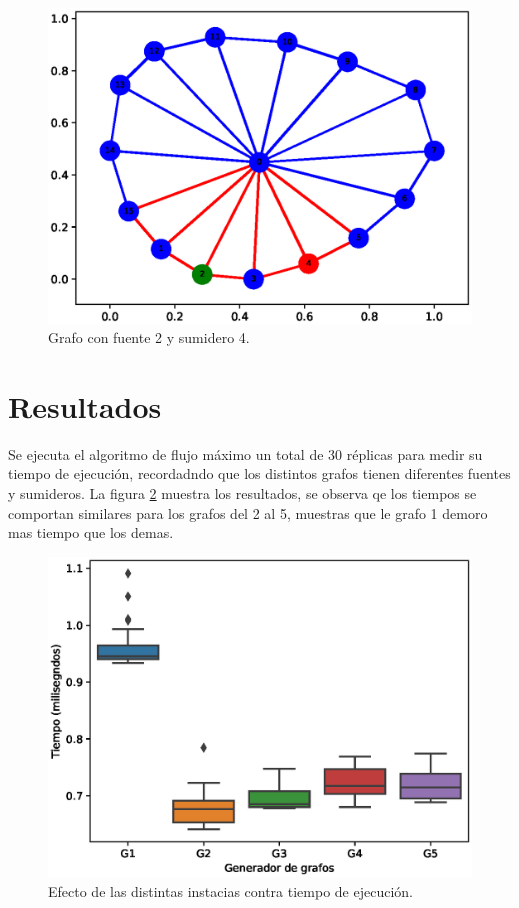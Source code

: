 \documentclass[12pt, a4paper]{article}
\begin{document}
\begin{figure} [H] \centering
\includegraphics[scale=0.8]{G5}
\caption{Grafo con fuente 2 y sumidero 4.}
\label{fig: g5}
\end{figure}

\section{Resultados}

Se ejecuta el algoritmo de flujo m\'aximo un total de 30 r\'eplicas para medir su tiempo de ejecuci\'on, recordadndo que los distintos grafos tienen diferentes fuentes y sumideros. La figura \ref{fig: fig1} muestra los resultados, se observa qe los tiempos se comportan similares para los grafos del 2 al 5, muestras que le grafo 1 demoro mas tiempo que los demas.

\begin{figure} [H] \centering
\includegraphics[scale=0.8]{figura1}
\caption{Efecto de las distintas instacias contra tiempo de ejecuci\'on.}
\label{fig: fig1}
\end{figure}
\end{document}
